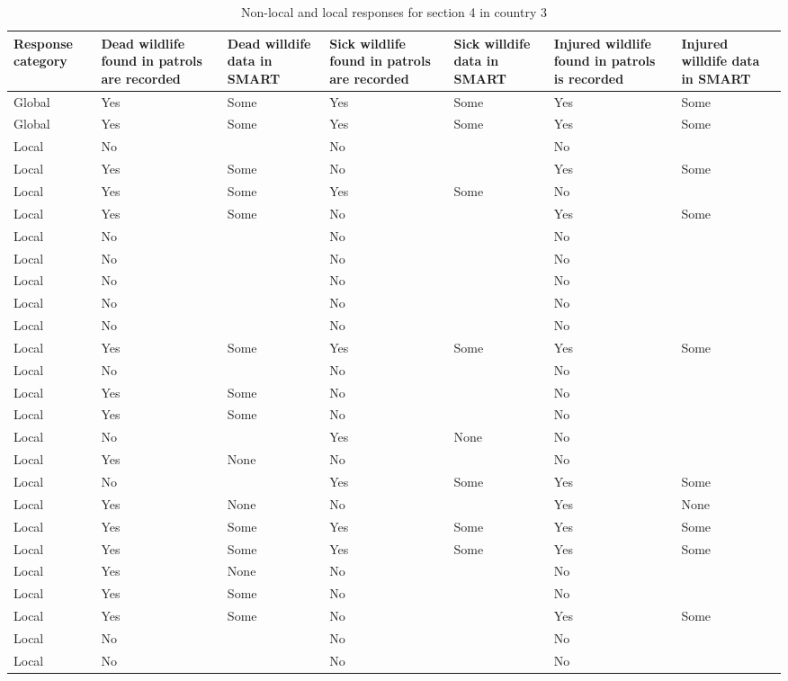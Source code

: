 \documentclass[
  letterpaper,
  DIV=11,
  numbers=noendperiod]{scrartcl}
\begin{document}
\begin{table}[H]

\caption{Non-local and local responses for section 4 in country 3}
\centering
\begin{tabular}[t]{>{\raggedright\arraybackslash}p{2cm}|>{\raggedright\arraybackslash}p{2cm}|>{\raggedright\arraybackslash}p{2cm}|>{\raggedright\arraybackslash}p{2cm}|>{\raggedright\arraybackslash}p{2cm}|>{\raggedright\arraybackslash}p{2cm}|>{\raggedright\arraybackslash}p{2cm}}
\hline
Response
category & Dead wildlife
found in patrols
are recorded & Dead willdife
data in SMART & Sick wildlife
found in patrols
are recorded & Sick willdife
data in SMART & Injured wildlife
found in patrols
is recorded & Injured willdife
data in SMART\\
\hline
Global & Yes & Some & Yes & Some & Yes & \vphantom{1} Some\\
\hline
Global & Yes & Some & Yes & Some & Yes & Some\\
\hline
Local & No &  & No &  & No \vphantom{8} & \\
\hline
Local & Yes & Some & No &  & Yes & \vphantom{2} Some\\
\hline
Local & Yes & Some & Yes & Some & No & \\
\hline
Local & Yes & Some & No &  & Yes & \vphantom{1} Some\\
\hline
Local & No &  & No &  & No \vphantom{7} & \\
\hline
Local & No &  & No &  & No \vphantom{6} & \\
\hline
Local & No &  & No &  & No \vphantom{5} & \\
\hline
Local & No &  & No &  & No \vphantom{4} & \\
\hline
Local & No &  & No &  & No \vphantom{3} & \\
\hline
Local & Yes & Some & Yes & Some & Yes & \vphantom{2} Some\\
\hline
Local & No &  & No &  & No \vphantom{2} & \\
\hline
Local & Yes & Some & No &  & No \vphantom{2} & \\
\hline
Local & Yes & Some & No &  & No \vphantom{1} & \\
\hline
Local & No &  & Yes & None & No & \\
\hline
Local & Yes & None & No &  & No \vphantom{1} & \\
\hline
Local & No &  & Yes & Some & Yes & Some\\
\hline
Local & Yes & None & No &  & Yes & None\\
\hline
Local & Yes & Some & Yes & Some & Yes & \vphantom{1} Some\\
\hline
Local & Yes & Some & Yes & Some & Yes & Some\\
\hline
Local & Yes & None & No &  & No & \\
\hline
Local & Yes & Some & No &  & No & \\
\hline
Local & Yes & Some & No &  & Yes & Some\\
\hline
Local & No &  & No &  & No \vphantom{1} & \\
\hline
Local & No &  & No &  & No & \\
\hline
\end{tabular}
\end{table}
\end{document}
